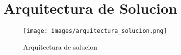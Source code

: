 \renewcommand{\sectionTitle}{Arquitectura de Solucion}
\section{\sectionTitle}
\label{sec:section2}

\begin{figure}[H]
    \centering
    \texttt{[image: images/arquitectura\_solucion.png]}
    \captionsetup{font=footnotesize}
    \caption{Arquitectura de solucion}
    \label{fig:img1}
\end{figure}


